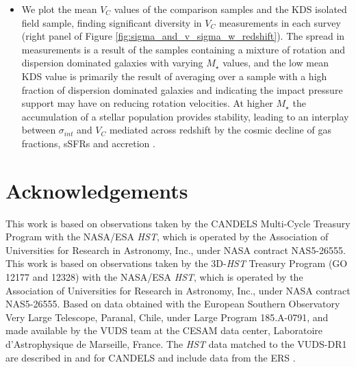 \documentclass[fleqn,usenatbib]{mn2e}
\begin{document}
\begin{itemize}
    \item We plot the mean $V_{C}$ values of the comparison samples and the KDS isolated field sample, finding significant diversity in $V_{C}$ measurements in each survey (right panel of Figure \ref{fig:sigma_and_v_sigma_w_redshift}).
    The spread in measurements is a result of the samples containing a mixture of rotation and dispersion dominated galaxies with varying $M_{\star}$ values, and the low mean KDS value is primarily the result of averaging over a sample with a high fraction of dispersion dominated galaxies and indicating the impact pressure support may have on reducing rotation velocities.
    At higher $M_{\star}$ the accumulation of a stellar population provides stability, leading to an interplay between $\sigma_{int}$ and $V_{C}$ mediated across redshift by the cosmic decline of gas fractions, sSFRs and accretion \citep[e.g.][]{Wisnioski2015}. 

\end{itemize}

\section*{Acknowledgements}

This work is based on observations taken by the CANDELS Multi-Cycle Treasury Program with the NASA/ESA {\em HST}, which is operated by the Association of Universities for Research in Astronomy, Inc., under NASA contract NAS5-26555.
This work is based on observations taken by the 3D-{\em HST} Treasury Program (GO 12177 and 12328) with the NASA/ESA {\em HST}, which is operated by the Association of Universities for Research in Astronomy, Inc., under NASA contract NAS5-26555.
Based on data obtained with the European Southern Observatory Very Large Telescope, Paranal, Chile, under Large Program 185.A-0791, and made available by the VUDS team at the CESAM data center, Laboratoire d'Astrophysique de Marseille, France.
The {\em HST} data matched to the VUDS-DR1 are described in \cite{Grogin2011} and \cite{Koekemoer2011} for CANDELS and include data from the ERS \cite{Windhorst2011}.




%
\end{document}
